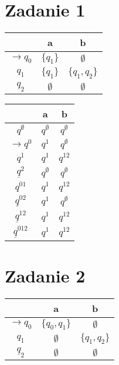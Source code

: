 \documentclass{article}
\begin{document}
\section*{Zadanie 1}

\begin{minipage}{.2\linewidth}
\centering
\begin{tabular}{ c | c | c }
  & a & b \\ 
\hline
$\rightarrow q_0$ & $\{q_1\}$ & $\emptyset$ \\  \hline
$q_1$ & $\{q_1\}$ & $\{q_1 , q_2\}$ \\ \hline
$\underline q_2$ & $\emptyset$ & $\emptyset$\\
\end{tabular}
\end{minipage}

\vspace{-1.8cm}
\begin{minipage}{.7\linewidth}
\centering
\begin{tabular}{ c | c | c }
  & a & b \\ 
\hline
$q^\emptyset$         & $q^\emptyset$   & $q^\emptyset$ \\  \hline
$\rightarrow q^0$     & $q^1$         & $q^\emptyset$ \\  \hline
$q^1$                 & $q^1$         & $q^{12}$ \\ \hline
$\underline q^2$      & $q^\emptyset$ & $q^\emptyset$ \\ \hline

$q^{01}$              & $q^1$         & $q^{12}$ \\ \hline
$\underline q^{02}$   & $q^1$         & $q^\emptyset$ \\ \hline
$\underline q^{12}$   & $q^1$         & $q^{12}$ \\ \hline

$\underline q^{012}$  & $q^1$         & $q^{12}$ \\ 

\end{tabular}
\end{minipage}


\section*{Zadanie 2}

\begin{minipage}{.2\linewidth}
\centering
\begin{tabular}{ c | c | c }
  & a & b \\ 
\hline
$\rightarrow q_0$   & $\{q_0 , q_1\}$ & $\emptyset$ \\  \hline
$q_1$               & $\emptyset$     & $\{q_1 , q_2\}$ \\ \hline
$\underline q_2$    & $\emptyset$     & $\emptyset$\\
\end{tabular}
\end{minipage}
\end{document}
